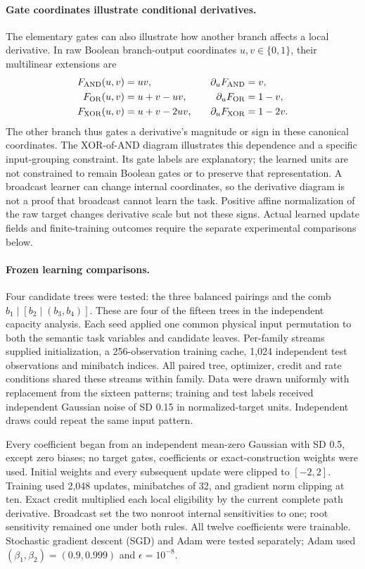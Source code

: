 \paragraph{Gate coordinates illustrate conditional derivatives.}
The elementary gates can also illustrate how another branch affects a
local derivative. In raw Boolean branch-output coordinates
$u,v\in\{0,1\}$, their multilinear extensions are
\begin{align}
 F_{\rm AND}(u,v)&=uv,&\quad \partial_uF_{\rm AND}&=v,\\
 F_{\rm OR}(u,v)&=u+v-uv,& \partial_uF_{\rm OR}&=1-v,\\
 F_{\rm XOR}(u,v)&=u+v-2uv,& \partial_uF_{\rm XOR}&=1-2v.
\end{align}
The other branch thus gates a derivative's magnitude or sign in these
canonical coordinates. The XOR-of-AND diagram illustrates this dependence
and a specific input-grouping constraint. Its gate labels are explanatory;
the learned units are not constrained to remain Boolean gates or to preserve
that representation. A broadcast learner can change internal coordinates,
so the derivative diagram is not a proof that broadcast cannot learn the
task. Positive affine normalization of the raw target changes derivative
scale but not these signs. Actual learned update fields and finite-training
outcomes require the separate experimental comparisons below.

\paragraph{Frozen learning comparisons.}
Four candidate trees were tested: the three balanced pairings and the comb
$b_1\mid[b_2\mid(b_3,b_4)]$. These are four of the fifteen trees in the independent
capacity analysis. Each seed applied one common physical input permutation
to both the semantic task variables and candidate leaves. Per-family streams
supplied initialization, a 256-observation training cache, 1,024 independent
test observations and minibatch indices. All paired tree, optimizer, credit
and rate conditions shared these streams within family. Data were drawn
uniformly with replacement from the sixteen patterns; training and test
labels received independent Gaussian noise of SD 0.15 in normalized-target
units. Independent draws could repeat the same input pattern.

Every coefficient began from an independent mean-zero Gaussian with SD 0.5,
except zero biases; no target gates, coefficients or exact-construction
weights were used. Initial weights and every subsequent update were clipped
to $[-2,2]$. Training used 2,048 updates, minibatches of 32, and gradient norm
clipping at ten. Exact credit multiplied each local eligibility by the
current complete path derivative. Broadcast set the two nonroot internal
sensitivities to one; root sensitivity remained one under both rules. All
twelve coefficients were trainable. Stochastic gradient descent (SGD) and Adam were tested separately;
Adam used $(\beta_1,\beta_2)=(0.9,0.999)$ and $\epsilon=10^{-8}$.

